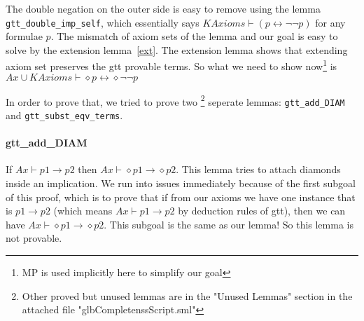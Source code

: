 \documentclass[submission,copyright,creativecommons]{eptcs}
\begin{document}
The double negation on the outer side is easy to remove using the lemma 
\texttt{gtt\_double\_imp\_self}, which essentially says $KAxioms \vdash (p \leftrightarrow \neg \neg p)$
for any formulae $p$. The mismatch of axiom sets of the lemma and our goal is easy 
to solve by the extension lemma~\ref{ext}. The 
extension lemma shows that extending axiom set preserves the gtt provable terms. So what we need to show now\footnote{MP is 
used implicitly here to simplify our goal} is 
$Ax \cup KAxioms \vdash \diamond p \leftrightarrow \diamond \neg \neg p$ 

In order to prove that, we tried to prove two
\footnote{Other proved but unused lemmas are in the "Unused Lemmas" section in the attached file "glbCompletenssScript.sml"} seperate lemmas: \texttt{gtt\_add\_DIAM}
and \texttt{gtt\_subst\_eqv\_terms}.

\paragraph{gtt\_add\_DIAM} If $Ax \vdash p1 \rightarrow p2$ then $Ax \vdash \diamond p1 \rightarrow \diamond p2$.
This lemma tries to attach diamonds inside an implication. 
We run into issues immediately because of the first subgoal of this 
proof, which is to prove that if from our axioms we have one instance that 
is $p1 \rightarrow p2$ (which means $Ax \vdash p1 \rightarrow p2$ by 
deduction rules of gtt), then we can have $Ax \vdash \diamond p1 \rightarrow \diamond p2$.
This subgoal is the same as our lemma! So this lemma is not provable. 
\end{document}

